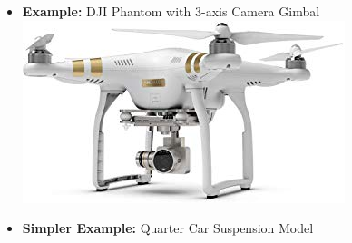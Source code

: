 \documentclass[11pt]{article}
\begin{document}
\begin{itemize}
\newpage

\item \textbf{ \Large  Example:} DJI Phantom with 3-axis Camera Gimbal \\

\includegraphics[scale=1]{dji_phantom.jpg}


\newpage

\item \textbf{ \Large  Simpler Example:} Quarter Car Suspension Model\\


\end{itemize}
\end{document}
